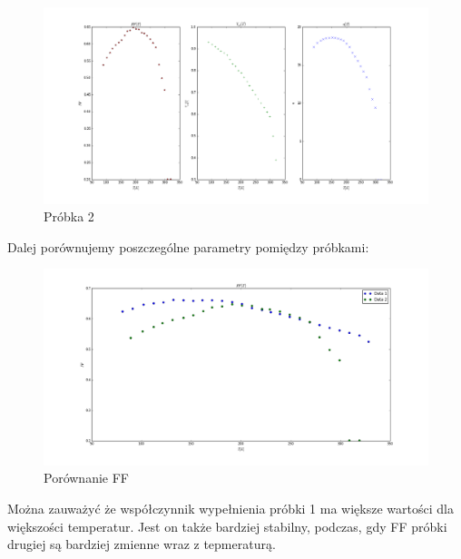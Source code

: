 \documentclass[a4paper,12pt]{article}
\begin{document}
\begin{figure} [H]
  \begin{center}
    \includegraphics[width = 15cm]{probka2_rozne.png}
    \caption{Próbka 2}
  \end{center}
\end{figure}

Dalej porównujemy poszczególne parametry pomiędzy próbkami:

\begin{figure} [H]
  \begin{center}
    \includegraphics[width = 15cm]{probki_porownanie_FF.png}
    \caption{Porównanie FF}
  \end{center}
\end{figure}

Można zauważyć że współczynnik wypełnienia próbki 1 ma większe wartości dla większości temperatur. Jest on także bardziej stabilny, podczas, gdy FF próbki drugiej są bardziej zmienne wraz z tepmeraturą. 
\end{document}
